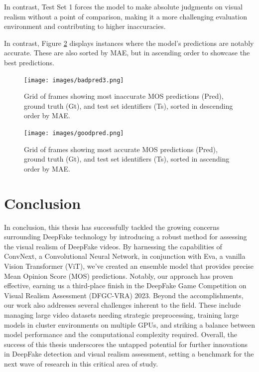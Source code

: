\documentclass[a4paper,12pt,openright]{book}
\begin{document}
In contrast, Test Set 1 forces the model to make absolute judgments on visual realism without a point of comparison, making it a more challenging evaluation environment and contributing to higher inaccuracies.

In contrast, Figure \ref{fig:goodpred} displays instances where the model's predictions are notably accurate. These are also sorted by MAE, but in ascending order to showcase the best predictions.

\begin{figure}[!htb]
\centering
\texttt{[image: images/badpred3.png]}
\caption{Grid of frames showing most inaccurate MOS predictions (Pred), ground truth (Gt), and test set identifiers (Ts), sorted in descending order by MAE.}
\label{fig:badpred}
\end{figure}

\begin{figure}[!htb]
\centering
\texttt{[image: images/goodpred.png]}
\caption{Grid of frames showing most accurate MOS predictions (Pred), ground truth (Gt), and test set identifiers (Ts), sorted in ascending order by MAE.}
\label{fig:goodpred}
\end{figure}
\chapter{Conclusion}
 In conclusion, this thesis has successfully tackled the growing concerns surrounding DeepFake technology by introducing a robust method for assessing the visual realism of DeepFake videos.
 By harnessing the capabilities of ConvNext, a Convolutional Neural Network, in conjunction with Eva, a vanilla Vision Transformer (ViT), we've created an ensemble model that provides precise Mean Opinion Score (MOS) predictions. Notably, our approach has proven effective, earning us a third-place finish in the DeepFake Game Competition on Visual Realism Assessment (DFGC-VRA) 2023.
Beyond the accomplishments, our work also addresses several challenges inherent to the field. These include managing large video datasets needing strategic preprocessing, training large models in cluster environments on multiple GPUs, and striking a balance between model performance and the computational complexity required.
Overall, the success of this thesis underscores the untapped potential for further innovations in DeepFake detection and visual realism assessment, setting a benchmark for the next wave of research in this critical area of study.
\end{document}
